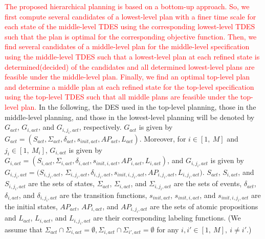 \documentclass[journal,twoside,web]{IEEEtran}
\newcommand{\red}[1]{\textcolor{red}{#1}}
\begin{document}
%
\red{The proposed hierarchical planning is based on a  bottom-up approach.
So, we first compute several candidates of a lowest-level plan with a finer time scale for each state of the middle-level TDES using the corresponding lowest-level TDES such that the plan is optimal for the corresponding objective function.
Then, we find several candidates of a middle-level plan for the middle-level specification using the middle-level TDES such that a lowest-level plan at each refined state is determined(decided) of the candidates and all determined lowest-level plans are feasible under the middle-level plan.
Finally, we find an optimal top-level plan and determine a middle plan at each refined state for the top-level specification using the top-level TDES such that all middle plans are feasible under the top-level plan.
}
In the following, the DES used in the top-level planning, those in the middle-level planning, and those in the lowest-level planning will be denoted by $G_{act}$, $G_{i,act}$, and $G_{i,{j_i},act}$, respectively.  
$G_{act}$ is given by $G_{act}=(S_{act},\Sigma_{act},\delta_{act},s_{init,act},AP_{act},L_{act})$.
Moreover, for $i \in [1,\ M]$ and $j_i\in [1,~M_i]$, $G_{i,act}$ is given by $G_{i,act}=(S_{i,act},\Sigma_{i,act},\delta_{i,act},s_{init,i,act},AP_{i,act},L_{i,act})$, and $G_{i,{j_i},act}$ is given by $G_{i,{j_i},act}=(S_{i,{j_i},act}$, $\Sigma_{i,{j_i},act},\delta_{i,{j_i},act},s_{init,i,{j_i},act},AP_{i,{j_i},act},L_{i,{j_i},act})$.
%
$S_{act}$, $S_{i,act}$, and $S_{i,{j_i},act}$ are the sets of states, $\Sigma_{act}$, $\Sigma_{i,act}$, and $\Sigma_{i,{j_i},act}$ are the sets of events, $\delta_{act}$, $\delta_{i,act}$, and $\delta_{i,{j_i},act}$ are the transition functions, $s_{init,act}$, $s_{init,i,act}$, and $s_{init,i,{j_i},act}$ are the initial states, $AP_{act}$, $AP_{i,act}$, and $AP_{i,{j_i},act}$ are the sets of atomic propositions and $L_{act}$, $L_{i,act}$, and $L_{i,{j_i},act}$ are their corresponding labeling functions.
(We assume that $\Sigma_{act} \cap \Sigma_{i,act} = \emptyset,\Sigma_{i,act} \cap \Sigma_{i',act} = \emptyset$ for any $i,i'\in[1,\ M],\ i\neq i'$.)
%
\end{document}
